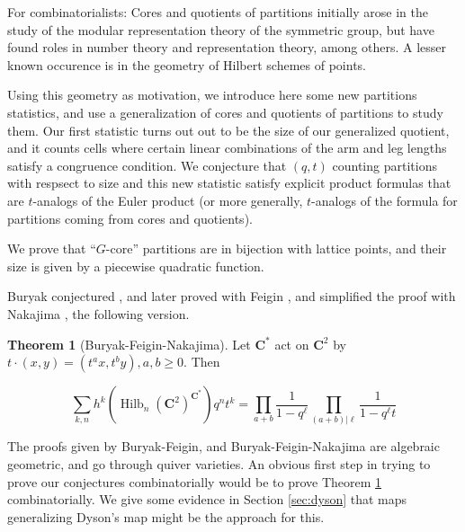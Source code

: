 \documentclass{amsart}[12pt]
\theoremstyle{definition}
\newtheorem{theorem}[dummy]{Theorem}
\newcommand{\C}{\mathbf{C}}
\DeclareMathOperator{\Hilb}{Hilb}
\begin{document}
For combinatorialists: Cores and quotients of partitions initially arose in the study of the modular representation theory of the symmetric group, but have found roles in number theory and representation theory, among others.  A lesser known occurence is in the geometry of Hilbert schemes of points.  

Using this geometry as motivation, we introduce here some new partitions statistics, and use a generalization of cores and quotients of partitions to study them.  Our first statistic turns out out to be the size of our generalized quotient, and it counts cells where certain linear combinations of the arm and leg lengths satisfy a congruence condition.  We conjecture that $(q,t)$ counting partitions with respsect to size and this new statistic satisfy explicit product formulas that are $t$-analogs of the Euler product (or more generally, $t$-analogs of the formula for partitions coming from cores and quotients).  

We prove that ``$G$-core'' partitions are in bijection with lattice points, and their size is given by a piecewise quadratic function.  




Buryak conjectured \cite{Buryak}, and later proved with Feigin \cite{BF}, and simplified the proof with Nakajima \cite{BFN}, the following version. 

\begin{theorem}[Buryak-Feigin-Nakajima] \label{thm:BFN}
Let $\C^*$ act on $\C^2$ by $t\cdot (x,y)=(t^ax, t^by), a,b\geq 0$.  Then

$$\sum_{k,n} h^k(\Hilb_n(\C^2)^{\C^*})q^nt^k=\prod_{a+b } \frac{1}{1-q^\ell}\prod_{(a+b)|\ell} \frac{1}{1-q^\ell t}$$
\end{theorem}

The proofs given by Buryak-Feigin, and Buryak-Feigin-Nakajima are algebraic geometric, and go through quiver varieties.  An obvious first step in trying to prove our conjectures combinatorially would be to prove Theorem \ref{thm:BFN} combinatorially.  We give some evidence in Section \ref{sec:dyson} that maps generalizing Dyson's map might be the approach for this.
\end{document}
